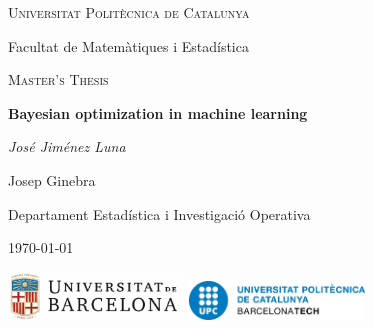 \documentclass[10pt,a4paper,twoside]{book}
\begin{document}

\begin{titlepage}
	\centering
	{\scshape\LARGE Universitat Polit\`ecnica de Catalunya\par
	 Facultat de Matem\`atiques i Estad\'istica\par}
	\vspace{1cm}
	{\scshape\Large Master's Thesis\par}
	\vspace{1.5cm}
	{\huge\bfseries Bayesian optimization in machine learning\par}
	\vspace{2cm}
	{\Large\itshape José Jiménez Luna\par}

	\vfill
	{\color{olive}{supervised by}}\par
	Josep Ginebra\par
	Departament Estadística i Investigació Operativa

	\vfill

	    {\large \today\par}
	    \vfill
		\includegraphics[width=0.35\textwidth]{figures/ublogo}\hspace{1cm}						\includegraphics[width=0.35\textwidth]{figures/upclogo}\par\vspace{1cm}
\par\vspace{1cm}
\end{titlepage}
\end{document}
